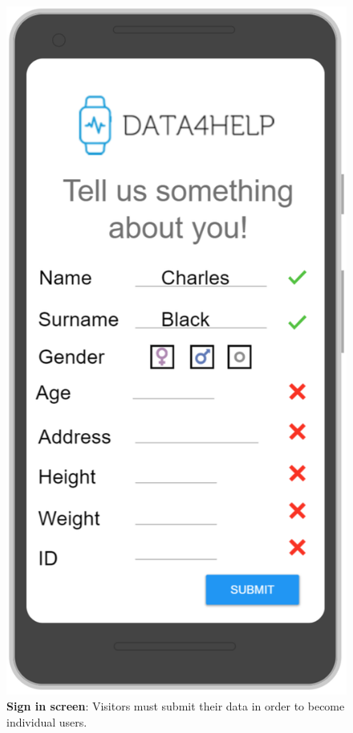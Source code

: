 \begin{figure}[H]
\centering
\includegraphics[scale = 0.5]{Mocks/Mobile_Sign_In.PNG}
\caption{\textbf{Sign in screen}: Visitors must submit their data in order to become individual users.}
\end{figure}

